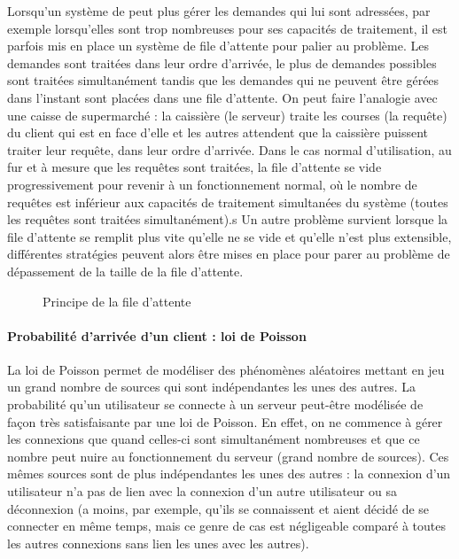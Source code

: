 \documentclass[french]{article}
\begin{document}
Lorsqu'un système de peut plus gérer les demandes qui lui sont adressées, par exemple lorsqu'elles sont trop nombreuses pour ses capacités de traitement, il est parfois mis en place un système de file d'attente pour palier au problème.
Les demandes sont traitées dans leur ordre d'arrivée, le plus de demandes possibles sont traitées simultanément tandis que les demandes qui ne peuvent être gérées dans l'instant sont placées dans une file d'attente. On peut faire l'analogie avec une caisse de supermarché : la caissière (le serveur) traite les courses (la requête) du client qui est en face d'elle et les autres attendent que la caissière puissent traiter leur requête, dans leur ordre d'arrivée.
Dans le cas normal d'utilisation, au fur et à mesure que les requêtes sont traitées, la file d'attente se vide progressivement pour revenir à un fonctionnement normal, où le nombre de requêtes est inférieur aux capacités de traitement simultanées du système (toutes les requêtes sont traitées simultanément).s
Un autre problème survient lorsque la file d'attente se remplit plus vite qu'elle ne se vide et qu'elle n'est plus extensible, différentes stratégies peuvent alors être mises en place pour parer au problème de dépassement de la taille de la file d'attente.

\begin{figure}[h]
	\caption{Principe de la file d'attente}
	\label{fig:file_attente}
\end{figure} 


\paragraph{Probabilité d'arrivée d'un client : loi de Poisson}

La loi de Poisson permet de modéliser des phénomènes aléatoires mettant en jeu un grand nombre de sources qui sont indépendantes les unes des autres.
La probabilité qu'un utilisateur se connecte à un serveur peut-être modélisée de façon très satisfaisante par une loi de Poisson. En effet, on ne commence à gérer les connexions que quand celles-ci sont simultanément nombreuses et que ce nombre peut nuire au fonctionnement du serveur (grand nombre de sources). Ces mêmes sources sont de plus indépendantes les unes des autres : la connexion d'un utilisateur n'a pas de lien avec la connexion d'un autre utilisateur ou sa déconnexion (a moins, par exemple, qu'ils se connaissent et aient décidé de se connecter en même temps, mais ce genre de cas est négligeable comparé à toutes les autres connexions sans lien les unes avec les autres).
\end{document}
